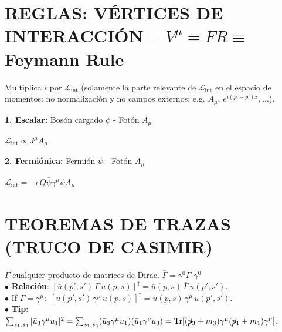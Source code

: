 \section{REGLAS: VÉRTICES DE INTERACCIÓN -- $V^\mu = FR \equiv$ Feymann Rule}
Multiplica $i$ por $\mathcal{L}_{\text{int}}$ (solamente la parte relevante de $\mathcal{L}_{\text{int}}$ en el espacio de momentos: no normalización y no campos externos: e.g. $A_\mu$, $e^{i(p_{\text{f}}- p_{\text{i}})x}, \dots$).\\

\begin{minipage}{0.49\linewidth}
\textbf{1. Escalar:} Bosón cargado $\phi$ - Fotón $A_\mu$ 
\begin{center}
$\mathcal{L}_{\text{int}} \propto J^\mu A_\mu$\vspace{3pt}
\end{center}
\end{minipage}
\begin{minipage}{0.49 \linewidth}
\textbf{2. Fermiónica:} Fermión $\psi$ - Fotón $A_\mu$ 
\begin{center}
$\mathcal{L}_{\text{int}} = -e Q \bar{\psi} \gamma^\mu \psi A_\mu$\vspace{3pt}
\end{center}    
\end{minipage}



\section{TEOREMAS DE TRAZAS (TRUCO DE CASIMIR)}
$\Gamma$ cualquier producto de matrices de Dirac. $\bar{\Gamma} = \gamma^0 \Gamma^\dagger\gamma^0$\\
$\bullet$ \textbf{Relación}: $[\bar{u}(p',s')\, \Gamma\, u(p,s)]^\dagger = \bar{u}(p,s)\, \bar{\Gamma}\, u(p',s').$ 
\\ $\bullet$ If $\Gamma=\gamma^\mu:$ $[\bar{u}(p',s')\, \gamma^\mu\, u(p,s)]^\dagger = \bar{u}(p,s)\, \gamma^\mu\, u(p',s').$\\
$\bullet$ \textbf{Tip}: $\sum_{s_1, s_3}| \bar{u}_3 \gamma^\mu u_1 |^2 = \sum_{s_1, s_3}(\bar{u}_3 \gamma^\mu u_1)(\bar{u}_1 \gamma^\nu u_3)= \text{Tr}[(\cancel{p}_3 + m_3)\gamma^\mu (\cancel{p}_1 + m_1)\gamma^\nu]$.





